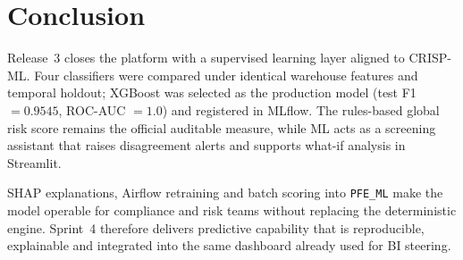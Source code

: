 %
%
%

\section{Conclusion}
\label{sec:release3_conclusion}

Release~3 closes the platform with a supervised learning layer aligned to CRISP-ML.
Four classifiers were compared under identical warehouse features and temporal
holdout; XGBoost was selected as the production model (test F1 $= 0.9545$,
ROC-AUC $= 1.0$) and registered in MLflow. The rules-based global risk score remains
the official auditable measure, while ML acts as a screening assistant that raises
disagreement alerts and supports what-if analysis in Streamlit.

SHAP explanations, Airflow retraining and batch scoring into \texttt{PFE\_ML} make the
model operable for compliance and risk teams without replacing the deterministic
engine. Sprint~4 therefore delivers predictive capability that is reproducible,
explainable and integrated into the same dashboard already used for BI steering.
